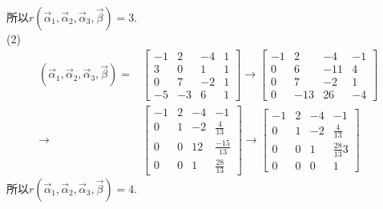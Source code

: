 \documentclass[a4paper]{book}
\begin{document}
所以$r(\vec{\alpha}_1, \vec{\alpha}_2,\vec{\alpha}_3,\vec{\beta})=3$.\\
(2)\begin{displaymath}\begin{aligned}(\vec{\alpha}_1, \vec{\alpha}_2,\vec{\alpha}_3,\vec{\beta})=&\begin{bmatrix}-1&2&-4&1\\ 3&0&1&1\\ 0&7&-2&1\\-5&-3&6&1\end{bmatrix}
\rightarrow \begin{bmatrix}-1&2&-4&-1\\ 0&6&-11&4\\ 0&7&-2&1\\0&-13&26&-4\end{bmatrix}\\
\rightarrow &\begin{bmatrix}-1&2&-4&-1\\ 0&1&-2&\frac{4}{13}\\ 0&0&12&\frac{-15}{13}\\0&0&1&\frac{28}{13}\end{bmatrix}
\rightarrow \begin{bmatrix}-1&2&-4&-1\\ 0&1&-2&\frac{4}{13}\\ 0&0&1&\frac{28}{13}3\\0&0&0&1\end{bmatrix}\end{aligned}\end{displaymath}
所以$r(\vec{\alpha}_1, \vec{\alpha}_2,\vec{\alpha}_3,\vec{\beta})=4$.
\end{document}
